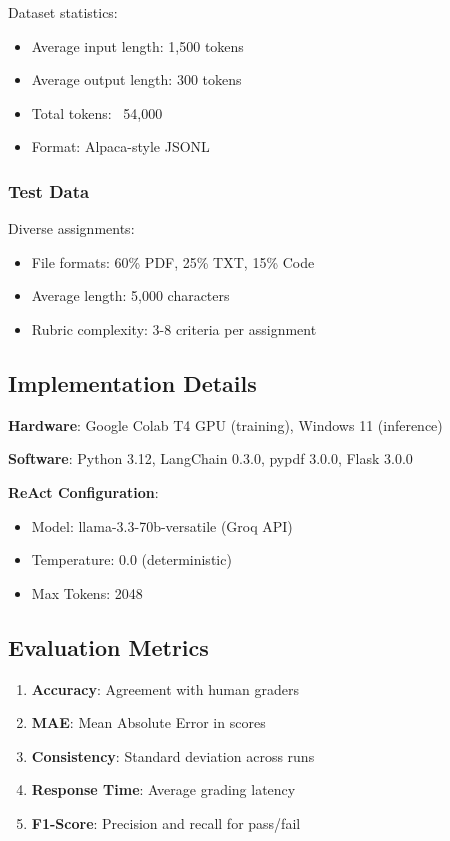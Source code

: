 \documentclass[runningheads]{llncs}
\begin{document}
Dataset statistics:
\begin{itemize}
    \item Average input length: 1,500 tokens
    \item Average output length: 300 tokens
    \item Total tokens: ~54,000
    \item Format: Alpaca-style JSONL
\end{itemize}

\subsubsection{Test Data}

Diverse assignments:
\begin{itemize}
    \item File formats: 60\% PDF, 25\% TXT, 15\% Code
    \item Average length: 5,000 characters
    \item Rubric complexity: 3-8 criteria per assignment
\end{itemize}

\subsection{Implementation Details}

\textbf{Hardware}: Google Colab T4 GPU (training), Windows 11 (inference)

\textbf{Software}: Python 3.12, LangChain 0.3.0, pypdf 3.0.0, Flask 3.0.0

\textbf{ReAct Configuration}:
\begin{itemize}
    \item Model: llama-3.3-70b-versatile (Groq API)
    \item Temperature: 0.0 (deterministic)
    \item Max Tokens: 2048
\end{itemize}

\subsection{Evaluation Metrics}

\begin{enumerate}
    \item \textbf{Accuracy}: Agreement with human graders
    \item \textbf{MAE}: Mean Absolute Error in scores
    \item \textbf{Consistency}: Standard deviation across runs
    \item \textbf{Response Time}: Average grading latency
    \item \textbf{F1-Score}: Precision and recall for pass/fail
\end{enumerate}
\end{document}
